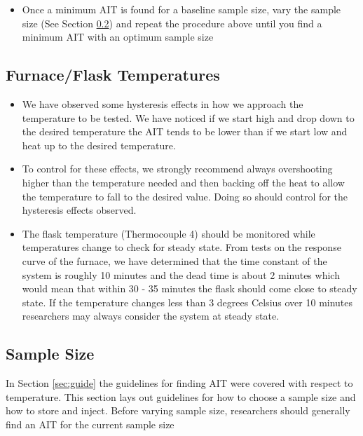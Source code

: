 \documentclass[letterpaper,11pt]{article}
\begin{document}
\begin{itemize}
    \item Once a minimum AIT is found for a baseline sample size, vary the 
        sample size (See Section \ref{sec:samp_sz}) and repeat the procedure 
        above until you find a minimum AIT with an optimum sample size
    \end{itemize}
    
    \subsection{Furnace/Flask Temperatures} \label{sec:hyst}
    \begin{itemize}
    \item We have observed some hysteresis effects in how we approach the 
        temperature to be tested. We have noticed if we start high and drop down
        to the desired temperature the AIT tends to be lower than if we start 
        low and heat up to the desired temperature.
    \item To control for these effects, we strongly recommend always 
        overshooting higher than the temperature needed and then backing off the
        heat to allow the temperature to fall to the desired value. Doing so
        should control for the hysteresis effects observed.
    \item The flask temperature (Thermocouple 4) should be monitored while 
        temperatures change to check for steady state. From tests on the 
        response curve of the furnace, we have determined that the time constant
        of the system is roughly 10 minutes and the dead time is about 2 minutes 
        which would mean that within 30 - 35 minutes the flask should come close
        to steady state. If the temperature changes less than 3 degrees Celsius 
        over 10 minutes researchers may always consider the system at steady 
        state.
    \end{itemize}
    
    \subsection{Sample Size} \label{sec:samp_sz}
    In Section \ref{sec:guide} the guidelines for finding AIT were covered with 
    respect to temperature. This section lays out guidelines for how to choose 
    a sample size and how to store and inject. Before varying sample size, 
    researchers should generally find an AIT for the current sample size
\end{document}
